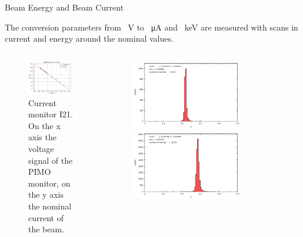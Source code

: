 \documentclass[9pt,a4paper]{beamer}
\begin{document}
\begin{frame}{Beam Energy and Beam Current}

The conversion parameters from \SI{}{\volt} to \SI{}{\micro \ampere} and \SI{}{\kilo \electronvolt} are measured with scans in current and energy around the nominal values.

\begin{columns}
\begin{column}{0.5\textwidth}
\begin{figure}
\includegraphics[width = 0.95\textwidth]{figures/I21.pdf}
\caption{ \footnotesize Current monitor I21. On the x axis the voltage signal of the PIMO monitor, on the y axis the nominal current of the beam.}
\end{figure}
\end{column}
\begin{column}{0.5\textwidth}
\begin{figure}
\includegraphics[width = 0.75\textwidth]{figures/ENMOvoltage15.pdf}
\includegraphics[width = 0.75\textwidth]{figures/ENMOvoltage20.pdf}

\end{figure}
\end{column}
\end{columns}
\end{frame}
\end{document}
